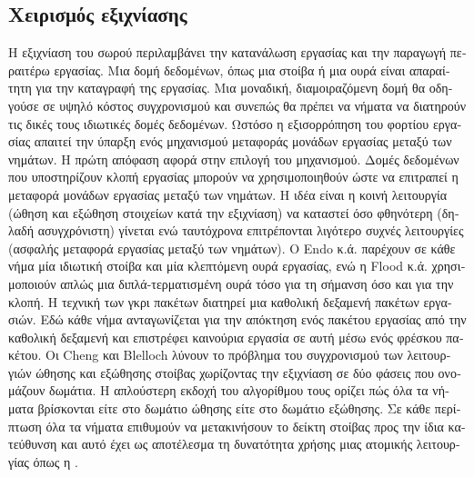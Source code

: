 \begin{greek}
\subsection{Χειρισμός εξιχνίασης}
Η εξιχνίαση του σωρού περιλαμβάνει την κατανάλωση εργασίας
και την παραγωγή περαιτέρω εργασίας. Μια δομή δεδομένων, όπως
μια στοίβα ή μια ουρά είναι απαραίτητη για την καταγραφή
της εργασίας. Μια μοναδική, διαμοιραζόμενη δομή θα οδηγούσε
σε υψηλό κόστος συγχρονισμού και συνεπώς θα πρέπει να νήματα
να διατηρούν τις δικές τους ιδιωτικές δομές δεδομένων. Ωστόσο
η εξισορρόπηση του φορτίου εργασίας απαιτεί την ύπαρξη ενός
μηχανισμού μεταφοράς μονάδων εργασίας μεταξύ των νημάτων.
Η πρώτη απόφαση αφορά στην επιλογή του μηχανισμού. Δομές
δεδομένων που υποστηρίζουν κλοπή εργασίας μπορούν να χρησιμοποιηθούν
ώστε να επιτραπεί η μεταφορά μονάδων εργασίας μεταξύ των νημάτων.
Η ιδέα είναι η κοινή λειτουργία (ώθηση και εξώθηση στοιχείων
κατά την εξιχνίαση) να καταστεί όσο φθηνότερη (δηλαδή ασυγχρόνιστη)
γίνεται ενώ ταυτόχρονα επιτρέπονται λιγότερο συχνές λειτουργίες
(ασφαλής μεταφορά εργασίας μεταξύ των νημάτων). Ο Endo κ.ά.
\cite{DBLP:conf/sc/EndoTY97} παρέχουν σε κάθε νήμα μία ιδιωτική
στοίβα και μία κλεπτόμενη ουρά εργασίας, ενώ η Flood κ.ά.
\cite{DBLP:conf/jvm/FloodDSZ01}
χρησιμοποιούν απλώς μια διπλά-τερματισμένη ουρά τόσο για τη
σήμανση όσο και για την κλοπή. Η τεχνική των γκρι πακέτων
\cite{DBLP:conf/pldi/OssiaBGKLO02}
διατηρεί μια καθολική δεξαμενή πακέτων εργασιών. Εδώ κάθε
νήμα ανταγωνίζεται για την απόκτηση ενός πακέτου εργασίας
από την καθολική δεξαμενή και επιστρέφει καινούρια εργασία
σε αυτή μέσω ενός φρέσκου πακέτου. Οι Cheng και Blelloch
\cite{DBLP:conf/pldi/ChengB01} λύνουν το πρόβλημα του συγχρονισμού των λειτουργιών
ώθησης και εξώθησης στοίβας χωρίζοντας την εξιχνίαση σε δύο
φάσεις που ονομάζουν δωμάτια. Η απλούστερη εκδοχή του αλγορίθμου
τους ορίζει πώς όλα τα νήματα βρίσκονται είτε στο δωμάτιο
ώθησης είτε στο δωμάτιο εξώθησης. Σε κάθε περίπτωση όλα τα
νήματα επιθυμούν να μετακινήσουν το δείκτη στοίβας προς την
ίδια κατεύθυνση και αυτό έχει ως αποτέλεσμα τη δυνατότητα
χρήσης μιας ατομικής λειτουργίας όπως η \textenglish{}.


\end{greek}
